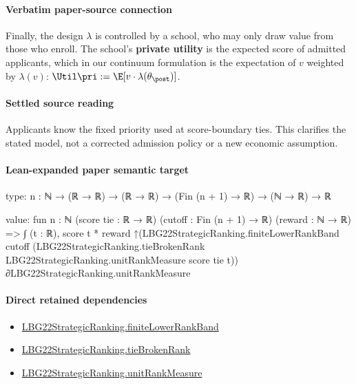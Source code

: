 \documentclass[10pt]{article}
\begin{document}
\paragraph{Verbatim paper-source connection}
\begin{ReviewVerbatim}
Finally, the design $\lambda$ is controlled by a school, who may only draw value from those who enroll. The school's \textbf{private utility} is the expected score of admitted applicants,
which in our continuum formulation is the expectation of $v$ weighted by $\lambda(v)$: %
\(	\Util\pri:= \E[v\cdot \lambda(\theta_\post)]\).
\end{ReviewVerbatim}

\paragraph{Settled source reading}
\begin{sloppypar}
Applicants know the fixed priority used at score-\allowbreak{}boundary ties.\allowbreak{} This clarifies the stated model, not a corrected admission policy or a new economic assumption.\allowbreak{}
\end{sloppypar}

\paragraph{Lean-expanded paper semantic target}
\begin{ReviewVerbatim}
type:
{n : ℕ} → (ℝ → ℝ) → (ℝ → ℝ) → (Fin (n + 1) → ℝ) → (ℕ → ℝ) → ℝ

value:
fun {n : ℕ} (score tie : ℝ → ℝ) (cutoff : Fin (n + 1) → ℝ) (reward : ℕ → ℝ) =>
  ∫ (t : ℝ),
    score t *
      reward
        ↑(LBG22StrategicRanking.finiteLowerRankBand cutoff
            (LBG22StrategicRanking.tieBrokenRank LBG22StrategicRanking.unitRankMeasure score tie
              t)) ∂LBG22StrategicRanking.unitRankMeasure
\end{ReviewVerbatim}

\paragraph{Direct retained dependencies}
\begin{itemize}\raggedright
\item \hyperlink{paper-prerequisite-a42f440ddc254fa7}{LBG22\allowbreak{}Strategic\allowbreak{}Ranking.\allowbreak{}finite\allowbreak{}Lower\allowbreak{}Rank\allowbreak{}Band}
\item \hyperlink{paper-prerequisite-b7c71e53177b76c6}{LBG22\allowbreak{}Strategic\allowbreak{}Ranking.\allowbreak{}tie\allowbreak{}Broken\allowbreak{}Rank}
\item \hyperlink{governing-declaration-678cf48d549cb620}{LBG22\allowbreak{}Strategic\allowbreak{}Ranking.\allowbreak{}unit\allowbreak{}Rank\allowbreak{}Measure}
\end{itemize}
\end{document}

